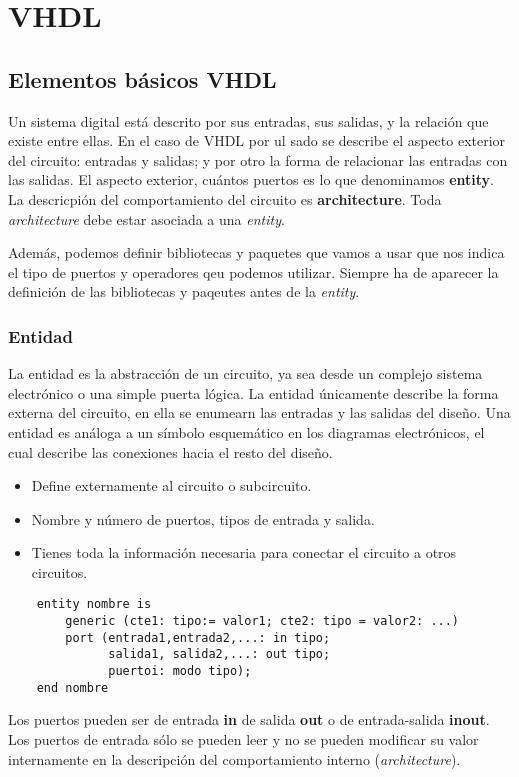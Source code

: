 \chapter{VHDL}

\section{Elementos básicos VHDL}

Un sistema digital está descrito por sus entradas, sus salidas, y la relación que existe entre ellas. En el caso de VHDL por ul sado se describe el aspecto exterior del circuito: entradas y salidas; y por otro la forma de relacionar las entradas con las salidas. El aspecto exterior, cuántos puertos es lo que denominamos \textbf{entity}. La descricpión del comportamiento del circuito es \textbf{architecture}. Toda \textit{architecture} debe estar asociada a una \textit{entity}.

Además, podemos definir bibliotecas y paquetes que vamos a usar que nos indica el tipo de puertos y operadores qeu podemos utilizar. Siempre ha de aparecer la definición de las bibliotecas y paqeutes antes de la \textit{entity}. 

\subsection{Entidad}

La entidad es la abstracción de un circuito, ya sea desde un complejo sistema electrónico o una simple puerta lógica. La entidad únicamente describe la forma externa del circuito, en ella se enumearn las entradas y las salidas del diseño. Una entidad es análoga a un símbolo esquemático en los diagramas electrónicos, el cual describe las conexiones hacia el resto del diseño. 

\begin{itemize}
    \item Define externamente al circuito o subcircuito.
    \item Nombre y número de puertos, tipos de entrada y salida. 
    \item Tienes toda la información necesaria para conectar el circuito a otros circuitos. 
\end{itemize}

\begin{lstlisting}
    entity nombre is 
        generic (cte1: tipo:= valor1; cte2: tipo = valor2: ...)
        port (entrada1,entrada2,...: in tipo;
              salida1, salida2,...: out tipo;
              puertoi: modo tipo);
    end nombre
\end{lstlisting}
Los puertos pueden ser de entrada \textbf{in} de salida \textbf{out} o de entrada-salida \textbf{inout}. Los puertos de entrada sólo se pueden leer y no se pueden modificar su valor internamente en la descripción del comportamiento interno (\textit{architecture}). 

